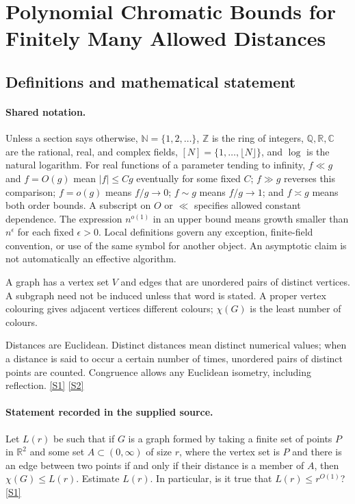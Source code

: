 \documentclass[11pt,a4paper]{article}
\newcommand{\N}{\mathbb{N}}
\newcommand{\Z}{\mathbb{Z}}
\newcommand{\Q}{\mathbb{Q}}
\newcommand{\R}{\mathbb{R}}
\newcommand{\C}{\mathbb{C}}
\newcommand{\sref}[2]{\hyperlink{source:#1:#2}{[S#2]}}
\begin{document}
\section{Polynomial Chromatic Bounds for Finitely Many Allowed Distances}\label{statement}


\subsection{Definitions and mathematical statement}

\paragraph{Shared notation.}Unless a section says otherwise, $\N=\{1,2,\ldots\}$,
$\Z$ is the ring of integers, $\Q,\R,\C$ are the rational, real, and complex
fields, $[N]=\{1,\ldots,\lfloor N\rfloor\}$, and $\log$ is the natural
logarithm. For real functions of a parameter tending to infinity,
$f\ll g$ and $f=O(g)$ mean $|f|\leq Cg$ eventually for some fixed $C$;
$f\gg g$ reverses this comparison; $f=o(g)$ means $f/g\to0$;
$f\sim g$ means $f/g\to1$; and $f\asymp g$ means both order bounds.
A subscript on $O$ or $\ll$ specifies allowed constant dependence.
The expression $n^{o(1)}$ in an upper bound means growth smaller than
$n^\epsilon$ for each fixed $\epsilon>0$. Local definitions govern any
exception, finite-field convention, or use of the same symbol for another
object. An asymptotic claim is not automatically an effective algorithm.



A graph has a vertex set $V$ and edges that are unordered pairs of distinct vertices. A subgraph need not be induced unless that word is stated. A proper vertex colouring gives adjacent vertices different colours; $\chi(G)$ is the least number of colours.

Distances are Euclidean. Distinct distances mean distinct numerical values; when a distance is said to occur a certain number of times, unordered pairs of distinct points are counted. Congruence allows any Euclidean isometry, including reflection. \sref{statement}{1} \sref{statement}{2}

\paragraph{Statement recorded in the supplied source.}
Let $L(r)$ be such that if $G$ is a graph formed by taking a finite set of points $P$ in $\mathbb{R}^2$ and some set $A\subset (0,\infty)$ of size $r$, where the vertex set is $P$ and there is an edge between two points if and only if their distance is a member of $A$, then $\chi(G)\leq L(r)$.
Estimate $L(r)$. In particular, is it true that $L(r)\leq r^{O(1)}$? \sref{statement}{1}
\end{document}
